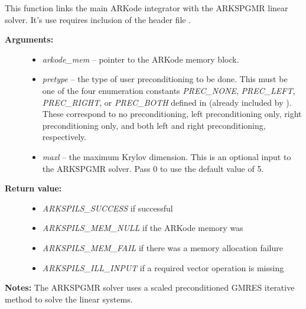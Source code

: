 \documentclass[letterpaper,10pt,english]{sphinxmanual}
\begin{document}

\begin{fulllineitems}
\label{c_interface/User_callable:c.ARKSpgmr}
This function links the main ARKode integrator with the ARKSPGMR
linear solver.  It's use requires inclusion of the header file
.
\begin{description}
\item[{\textbf{Arguments:}}] \leavevmode\begin{itemize}
\item {} 
\emph{arkode\_mem} -- pointer to the ARKode memory block.

\item {} 
\emph{pretype} -- the type of user preconditioning to be done.  This
must be one of the four enumeration constants \emph{PREC\_NONE},
\emph{PREC\_LEFT}, \emph{PREC\_RIGHT}, or \emph{PREC\_BOTH} defined in
 (already included by
). These correspond to no preconditioning,
left preconditioning only, right preconditioning only, and
both left and right preconditioning, respectively.

\item {} 
\emph{maxl} -- the maximum Krylov dimension. This is an optional input
to the ARKSPGMR solver. Pass 0 to use the default value of 5.

\end{itemize}

\item[{\textbf{Return value:}}] \leavevmode\begin{itemize}
\item {} 
\emph{ARKSPILS\_SUCCESS} if successful

\item {} 
\emph{ARKSPILS\_MEM\_NULL}  if the ARKode memory was 

\item {} 
\emph{ARKSPILS\_MEM\_FAIL}  if there was a memory allocation failure

\item {} 
\emph{ARKSPILS\_ILL\_INPUT} if a required vector operation is missing

\end{itemize}

\end{description}

\textbf{Notes:} The ARKSPGMR solver uses a scaled preconditioned GMRES
iterative method to solve the linear systems.

\end{fulllineitems}
\end{document}
